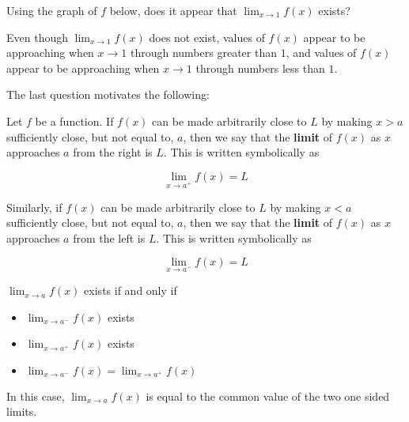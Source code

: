 \documentclass{ximera}
\begin{document}


\begin{question}
Using the graph of $f$ below, does it appear that $\lim_{x \to 1} f(x)$ exists?  


\begin{multipleChoice}
\end{multipleChoice}


\begin{feedback}
  Even though $\lim_{x \to 1} f(x)$ does not exist, values of
  $f(x)$ appear to be approaching  when $x \to 1$
  through numbers greater than $1$, and values of $f(x)$ appear
  to be approaching  when $x \to 1$ through numbers
  less than $1$.
\end{feedback}

\end{question}

The last question motivates the following:

\begin{definition}
  Let $f$ be a function.  If $f(x)$ can be made arbitrarily close to $L$ by making $x>a$ sufficiently close, but not equal to, $a$, then we say that the \textbf{limit} of $f(x)$ as $x$ approaches $a$ from the right is $L$.  This is written symbolically as

  \[
\lim_{x\to a^+} f(x) = L
\]

Similarly, if $f(x)$ can be made arbitrarily close to $L$ by making
$x<a$ sufficiently close, but not equal to, $a$, then we say that the
\textbf{limit} of $f(x)$ as $x$ approaches $a$ from the left is $L$.
This is written symbolically as

\[
\lim_{x\to a^-} f(x) = L
\]

\end{definition}


\begin{theorem}
	$\lim_{x \to a} f(x)$ exists if and only if  
	\begin{itemize}
	   \item $\lim_{x \to a^-} f(x)$ exists
	   \item $\lim_{x \to a^+} f(x)$ exists
	   \item $\lim_{x \to a^-} f(x) = \lim_{x \to a^+} f(x)$
	\end{itemize}
	In this case, $\lim_{x \to a} f(x)$ is equal to the common
        value of the two one sided limits.
\end{theorem}
\end{document}
